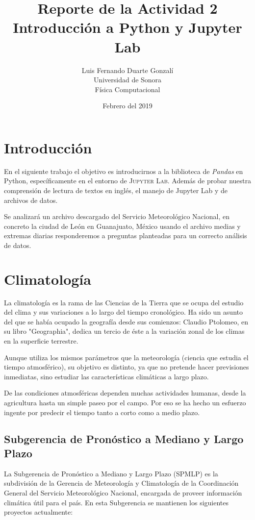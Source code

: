 \documentclass{article}
\title{\textbf{Reporte de la Actividad 2}\\ Introducción a Python y Jupyter Lab}
\author{Luis Fernando Duarte Gonzalí \\ Universidad de Sonora \\ Física Computacional}
\date{Febrero del 2019}
\begin{document}
\maketitle


\section{Introducción}

\noindent En el siguiente trabajo el objetivo es introducirnos a la biblioteca de \textit{Pandas} en Python, específicamente en el entorno de \textsc{Jupyter Lab}. Además de probar nuestra comprensión de lectura de textos en inglés, el manejo de Jupyter Lab y de archivos de datos.

Se analizará un archivo descargado del Servicio Meteorológico Nacional, en concreto la ciudad de León en Guanajuato, México usando el archivo medias y extremas diarias responderemos a preguntas planteadas para un correcto análisis de datos.

\section{Climatología}

La climatología es la rama de las Ciencias de la Tierra que se ocupa del estudio del clima y sus variaciones a lo largo del tiempo cronológico. Ha sido un asunto del que se había ocupado la geografía desde sus comienzos: Claudio Ptolomeo, en su libro "Geographia", dedica un tercio de éste a la variación zonal de los climas en la superficie terrestre.

Aunque utiliza los mismos parámetros que la meteorología (ciencia que estudia el tiempo atmosférico), su objetivo es distinto, ya que no pretende hacer previsiones inmediatas, sino estudiar las características climáticas a largo plazo.

De las condiciones atmosféricas dependen muchas actividades humanas, desde la agricultura hasta un simple paseo por el campo. Por eso se ha hecho un esfuerzo ingente por predecir el tiempo tanto a corto como a medio plazo.

\subsection{Subgerencia de Pronóstico a Mediano y Largo Plazo}

La Subgerencia de Pronóstico a Mediano y Largo Plazo (SPMLP) es la subdivisión de la Gerencia de Meteorología y Climatología de la Coordinación General del Servicio Meteorológico Nacional, encargada de proveer información climática útil para el país. En esta Subgerencia se mantienen los siguientes proyectos actualmente:
\end{document}
